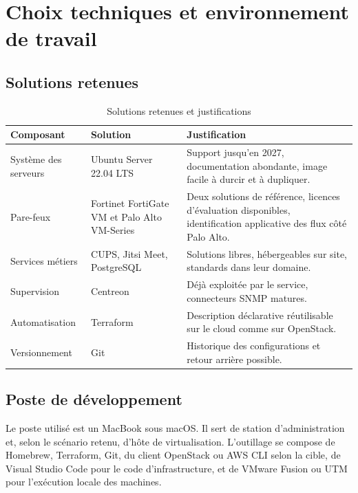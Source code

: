 \documentclass[11pt,a4paper]{article}
\begin{document}
\section{Choix techniques et environnement de travail}

\subsection{Solutions retenues}
\begin{table}[H]
\centering
\caption{Solutions retenues et justifications}
\begin{tabularx}{\textwidth}{L{3.0cm} L{4.0cm} Y}
\toprule
{}\textbf{Composant} & \textbf{Solution} & \textbf{Justification} \\
\midrule
Système des serveurs & Ubuntu Server 22.04 LTS & Support jusqu'en 2027, documentation abondante, image facile à durcir et à dupliquer. \\
Pare-feux & Fortinet FortiGate VM et Palo Alto VM-Series & Deux solutions de référence, licences d'évaluation disponibles, identification applicative des flux côté Palo Alto. \\
Services métiers & CUPS, Jitsi Meet, PostgreSQL & Solutions libres, hébergeables sur site, standards dans leur domaine. \\
Supervision & Centreon & Déjà exploitée par le service, connecteurs SNMP matures. \\
Automatisation & Terraform & Description déclarative réutilisable sur le cloud comme sur OpenStack. \\
Versionnement & Git & Historique des configurations et retour arrière possible. \\
\bottomrule
\end{tabularx}
\end{table}

\subsection{Poste de développement}
Le poste utilisé est un MacBook sous macOS. Il sert de station d'administration et, selon le scénario retenu, d'hôte de virtualisation. L'outillage se compose de Homebrew, Terraform, Git, du client OpenStack ou AWS CLI selon la cible, de Visual Studio Code pour le code d'infrastructure, et de VMware Fusion ou UTM pour l'exécution locale des machines.
\end{document}
